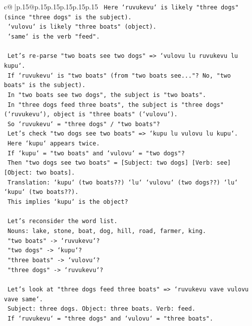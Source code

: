 \documentclass{article}
\begin{document}
{\begin{supertabular}{c@{$\;$}|p{.15\linewidth}@{}p{.15\linewidth}p{.15\linewidth}p{.15\linewidth}p{.15\linewidth}p{.15\linewidth}}
{{{\texttt{   Here `ruvukevu` is likely "three dogs" (since "three dogs" is the subject).} \\
\texttt{   `vulovu` is likely "three boats" (object).} \\
\texttt{   `same` is the verb "feed".} \\
\\ 
\texttt{   Let's re{-}parse "two boats see two dogs" => `vulovu lu ruvukevu lu kupu`.} \\
\texttt{   If `ruvukevu` is "two boats" (from "two boats see..."? No, "two boats" is the subject).} \\
\texttt{   In "two boats see two dogs", the subject is "two boats".} \\
\texttt{   In "three dogs feed three boats", the subject is "three dogs" (`ruvukevu`), object is "three boats" (`vulovu`).} \\
\texttt{   So `ruvukevu` = "three dogs" / "two boats"?} \\
\texttt{   Let's check "two dogs see two boats" => `kupu lu vulovu lu kupu`.} \\
\texttt{   Here `kupu` appears twice.} \\
\texttt{   If `kupu` = "two boats" and `vulovu` = "two dogs"?} \\
\texttt{   Then "two dogs see two boats" = {[}Subject: two dogs{]} {[}Verb: see{]} {[}Object: two boats{]}.} \\
\texttt{   Translation: `kupu` (two boats??) `lu` `vulovu` (two dogs??) `lu` `kupu` (two boats??).} \\
\texttt{   This implies `kupu` is the object?} \\
\\ 
\texttt{   Let's reconsider the word list.} \\
\texttt{   Nouns: lake, stone, boat, dog, hill, road, farmer, king.} \\
\texttt{   "two boats" {-}> `ruvukevu`?} \\
\texttt{   "two dogs" {-}> `kupu`?} \\
\texttt{   "three boats" {-}> `vulovu`?} \\
\texttt{   "three dogs" {-}> `ruvukevu`?} \\
\\ 
\texttt{   Let's look at "three dogs feed three boats" => `ruvukevu vave vulovu vave same`.} \\
\texttt{   Subject: three dogs. Object: three boats. Verb: feed.} \\
\texttt{   If `ruvukevu` = "three dogs" and `vulovu` = "three boats".} \\
}}}
\end{supertabular}}
\end{document}
